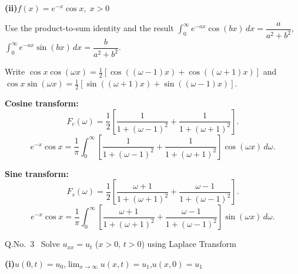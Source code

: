\documentclass[12pt]{article}
\begin{document}
\medskip\textbf{(ii)}\quad $f(x)=e^{-x}\cos x,\;x>0$

\begin{ansbox}
Use the product-to-sum identity and the result $\int_0^\infty e^{-ax}\cos(bx)\,dx=\dfrac{a}{a^2+b^2}$,\; $\int_0^\infty e^{-ax}\sin(bx)\,dx=\dfrac{b}{a^2+b^2}$.

Write $\cos x\cos(\omega x)=\tfrac{1}{2}[\cos((\omega-1)x)+\cos((\omega+1)x)]$ and $\cos x\sin(\omega x)=\tfrac{1}{2}[\sin((\omega+1)x)+\sin((\omega-1)x)]$.

\textbf{Cosine transform:}
\[
  F_c(\omega)=\frac{1}{2}\!\left[\frac{1}{1+(\omega-1)^2}+\frac{1}{1+(\omega+1)^2}\right].
\]
\[
  \boxed{e^{-x}\cos x=\frac{1}{\pi}\int_0^\infty\!\left[\frac{1}{1+(\omega-1)^2}+\frac{1}{1+(\omega+1)^2}\right]\cos(\omega x)\,d\omega.}
\]

\textbf{Sine transform:}
\[
  F_s(\omega)=\frac{1}{2}\!\left[\frac{\omega+1}{1+(\omega+1)^2}+\frac{\omega-1}{1+(\omega-1)^2}\right].
\]
\[
  \boxed{e^{-x}\cos x=\frac{1}{\pi}\int_0^\infty\!\left[\frac{\omega+1}{1+(\omega+1)^2}+\frac{\omega-1}{1+(\omega-1)^2}\right]\sin(\omega x)\,d\omega.}
\]
\end{ansbox}

\newpage

\begin{qbox}{Q.No.\ 3 \textemdash\ Solve $u_{xx}=u_t$ ($x>0,\,t>0$) using Laplace Transform}
\end{qbox}

\medskip\textbf{(i)}\quad $u(0,t)=u_0$,\quad $\lim_{x\to\infty}u(x,t)=u_1$,\quad $u(x,0)=u_1$
\end{document}
